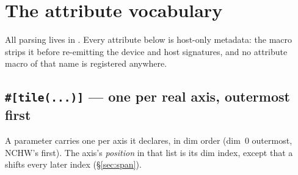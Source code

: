 \section{The attribute vocabulary}
\label{sec:attrs}

All parsing lives in . Every
attribute below is host-only metadata: the macro strips it before re-emitting the
device and host signatures, and no attribute macro of that name is registered
anywhere.

\subsection{\texttt{\#[tile(...)]} --- one per real axis, outermost first}

A parameter carries one \code{#[tile(...)]} per axis it declares, in dim order
(dim~0 outermost, NCHW's  first). The axis's \emph{position} in that list is
its dim index, except that a  shifts every later index
(\S\ref{sec:span}).

